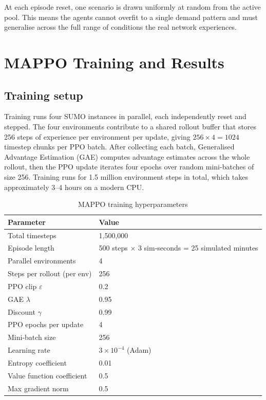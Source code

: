 \documentclass[11pt, a4paper]{report}
\begin{document}
At each episode reset, one scenario is drawn uniformly at random from the active pool. This means the agents cannot overfit to a single demand pattern and must generalise across the full range of conditions the real network experiences.

\chapter{MAPPO Training and Results}
\label{chap:mappo_results}

\section{Training setup}

Training runs four SUMO instances in parallel, each independently reset and stepped. The four environments contribute to a shared rollout buffer that stores 256 steps of experience per environment per update, giving $256 \times 4 = 1024$ timestep chunks per PPO batch. After collecting each batch, Generalised Advantage Estimation (GAE) computes advantage estimates across the whole rollout, then the PPO update iterates four epochs over random mini-batches of size 256. Training runs for 1.5 million environment steps in total, which takes approximately 3--4 hours on a modern CPU.

\begin{table}[H]
\centering
\caption{MAPPO training hyperparameters}
\label{tab:hyperparams}
\begin{tabular}{ll}
\toprule
\textbf{Parameter} & \textbf{Value} \\
\midrule
Total timesteps & 1,500,000 \\
Episode length & 500 steps $\times$ 3 sim-seconds = 25 simulated minutes \\
Parallel environments & 4 \\
Steps per rollout (per env) & 256 \\
PPO clip $\varepsilon$ & 0.2 \\
GAE $\lambda$ & 0.95 \\
Discount $\gamma$ & 0.99 \\
PPO epochs per update & 4 \\
Mini-batch size & 256 \\
Learning rate & $3 \times 10^{-4}$ (Adam) \\
Entropy coefficient & 0.01 \\
Value function coefficient & 0.5 \\
Max gradient norm & 0.5 \\
\bottomrule
\end{tabular}
\end{table}
\end{document}
